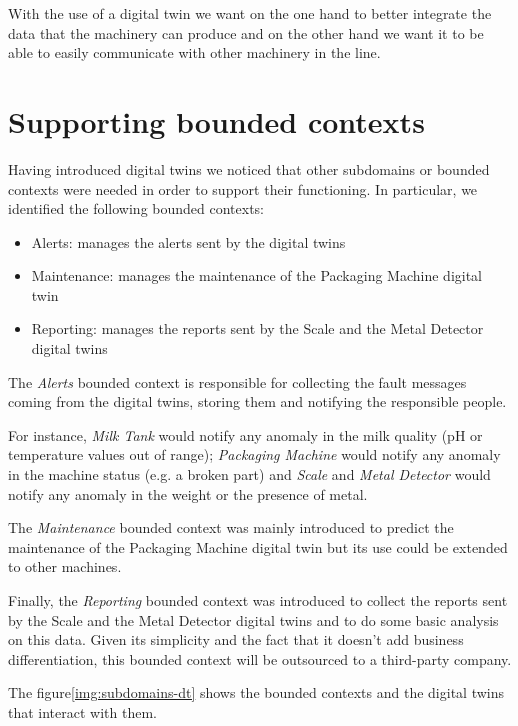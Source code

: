 With the use of a digital twin we want on the one hand to better integrate the data that the machinery can produce and on the other hand we
want it to be able to easily communicate with other machinery in the line.

\section{Supporting bounded contexts}
Having introduced digital twins we noticed that other subdomains or bounded contexts were needed in order to support their functioning.
In particular, we identified the following bounded contexts:
\begin{itemize}
	\item Alerts: manages the alerts sent by the digital twins
	\item Maintenance: manages the maintenance of the Packaging Machine digital twin
	\item Reporting: manages the reports sent by the Scale and the Metal Detector digital twins
\end{itemize}

The \textit{Alerts} bounded context is responsible for collecting the fault messages coming from the digital twins, storing them and notifying the responsible people.

For instance, \textit{Milk Tank} would notify any anomaly in the milk quality (pH or temperature values out of range);
\textit{Packaging Machine} would notify any anomaly in the machine status (e.g. a broken part) and \textit{Scale} and \textit{Metal Detector} would notify any anomaly in the weight or the presence of metal.

The \textit{Maintenance} bounded context was mainly introduced to predict the maintenance of the Packaging Machine digital twin but its use could be extended to other machines.

Finally, the \textit{Reporting} bounded context was introduced to collect the reports sent by the Scale and the Metal Detector digital twins and to do some basic analysis on this data.
Given its simplicity and the fact that it doesn't add business differentiation, this bounded context will be outsourced to a third-party company.

The figure\ref{img:subdomains-dt} shows the bounded contexts and the digital twins that interact with them.

